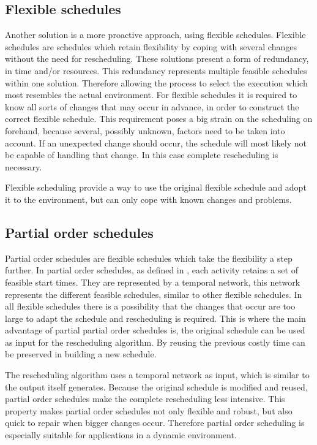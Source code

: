 \documentclass{article}
\begin{document}
\subsection{Flexible schedules}
Another solution is a more proactive approach, using flexible schedules.
Flexible schedules are schedules which retain flexibility by coping with several changes without the need for rescheduling.
These solutions present a form of redundancy, in time and/or resources.
This redundancy represents multiple feasible schedules within one solution.
Therefore allowing the process to select the execution which most resembles the actual environment.
For flexible schedules it is required to know all sorts of changes that may occur in advance, in order to construct the correct flexible schedule.
This requirement poses a big strain on the scheduling on forehand, because several, possibly unknown, factors need to be taken into account.
If an unexpected change should occur, the schedule will most likely not be capable of handling that change.
In this case complete rescheduling is necessary.

Flexible scheduling provide a way to use the original flexible schedule and adopt it to the environment, but can only cope with known changes and problems.

\subsection{Partial order schedules}
Partial order schedules are flexible schedules which take the flexibility a step further.
In partial order schedules, as defined in \citet{policella07}, each activity retains a set of feasible start times.
They are represented by a temporal network, this network represents the different feasible schedules, similar to other flexible schedules.
In all flexible schedules there is a possibility that the changes that occur are too large to adapt the schedule and rescheduling is required.
This is where the main advantage of partial partial order schedules is, the original schedule can be used as input for the rescheduling algorithm.
By reusing the previous costly time can be preserved in building a new schedule.

The rescheduling algorithm uses a temporal network as input, which is similar to the output itself generates.
Because the original schedule is modified and reused, partial order schedules make the complete rescheduling less intensive.
This property makes partial order schedules not only flexible and robust, but also quick to repair when bigger changes occur.
Therefore partial order scheduling is especially suitable for applications in a dynamic environment.
\end{document}
